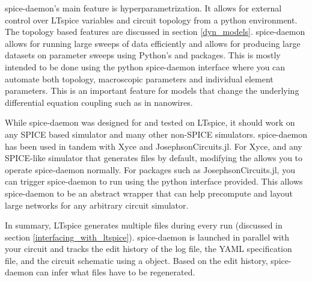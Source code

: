 spice-daemon's main feature is hyperparametrization. It allows for external control
over LTspice variables and circuit topology from a python environment. The topology
based features are discussed in section \ref{dyn_models}. spice-daemon allows for 
running large sweeps of data efficiently and allows for producing large datasets
on parameter sweeps using Python's  and  packages. This is mostly
intended to be done using the python spice-daemon interface where you can automate
both topology, macroscopic parameters and individual element parameters. This is 
an important feature for models that change the underlying differential equation 
coupling such as in nanowires.

While spice-daemon was designed for and tested on LTspice, it should work on any
SPICE based simulator and many other non-SPICE simulators. spice-daemon has been
used in tandem with Xyce and JosephsonCircuits.jl. For Xyce, and any SPICE-like
simulator that generates files by default, modifying the  allows you
to operate spice-daemon normally. For packages such as JosephsonCircuits.jl, you can
trigger spice-daemon to run using the python interface provided. This allows
spice-daemon to be an abstract wrapper that can help precompute and layout large
networks for any arbitrary circuit simulator.

In summary, LTspice generates multiple files during every run (discussed in section \ref{interfacing_with_ltspice}). spice-daemon is launched in parallel with your circuit
and tracks the edit history of the log file,
the YAML specification file, and the 
circuit schematic using a  object. Based on the edit history, spice-daemon
can infer what files have to be regenerated.






